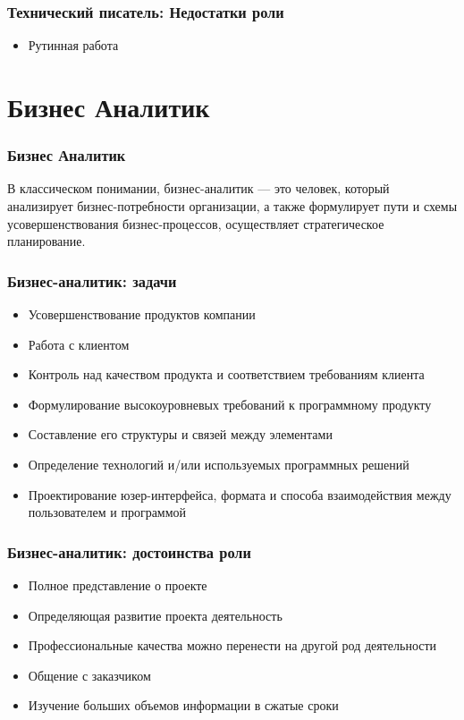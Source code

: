 \documentclass{../industrial-development}
\begin{document}
	\begin{frame} \frametitle{Технический писатель: Недостатки роли}
		\begin{block}{}
			\begin{itemize}
				\item Рутинная работа
			\end{itemize}
		\end{block}
	\end{frame}
	
	\section{Бизнес Аналитик}
	
	\begin{frame} \frametitle{Бизнес Аналитик}
		\begin{block}{}
			\alert {}В классическом понимании, {бизнес-аналитик} — это человек, который анализирует бизнес-потребности организации, а также формулирует пути и схемы усовершенствования бизнес-процессов, осуществляет стратегическое планирование. 
		\end{block}
		
	\end{frame}
	
	\begin{frame} \frametitle{Бизнес-аналитик: задачи}
		\begin{itemize}
			\item Усовершенствование продуктов компании
			\item Работа с клиентом
			\item Контроль над качеством продукта и соответствием требованиям клиента
			\item Формулирование высокоуровневых требований к программному продукту
			\item Составление его структуры и связей между элементами
			\item Определение технологий и/или используемых программных решений
			\item Проектирование юзер-интерфейса, формата и способа взаимодействия между пользователем и программой
		\end{itemize}
	\end{frame}
	
	\begin{frame} \frametitle{Бизнес-аналитик: достоинства роли}
		\begin{itemize}
			\item Полное представление о проекте
			\item Определяющая развитие проекта деятельность
			\item Профессиональные качества можно перенести на другой род деятельности
			\item Общение с заказчиком
			\item Изучение больших объемов информации в сжатые сроки
		\end{itemize}
	\end{frame}
	
\end{document}
